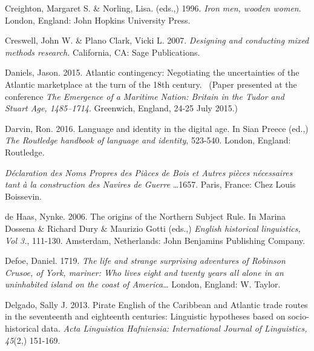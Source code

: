 \begin{styleStandard}
Creighton, Margaret S. \& Norling, Lisa. (eds.,) 1996. \textit{Iron men, wooden women}. London, England: John Hopkins University Press. 
\end{styleStandard}


\begin{styleStandard}
Creswell, John W. \& Plano Clark, Vicki L. 2007. \textit{Designing and conducting mixed methods research.} California, CA: Sage Publications.
\end{styleStandard}


\begin{styleStandard}
Daniels, Jason. 2015. Atlantic contingency: Negotiating the uncertainties of the Atlantic marketplace at the turn of the 18th century. \ (Paper presented at the conference \textit{The Emergence of a Maritime Nation: Britain in the Tudor and Stuart Age, 1485–1714}. Greenwich, England, 24-25 July 2015.)
\end{styleStandard}


\begin{styleStandard}
Darvin, Ron. 2016. Language and identity in the digital age. In Sian Preece (ed.,) \textit{The Routledge handbook of language and identity}, 523-540. London, England: Routledge. 
\end{styleStandard}


\begin{styleStandard}
\textit{Déclaration des Noms Propres des Piàces de Bois et Autres pièces nécessaires tant à la construction des Navires de Guerre }…1657. Paris, France: Chez Louis Boissevin.
\end{styleStandard}


\begin{styleStandard}
de Haas, Nynke. 2006. The origins of the Northern Subject Rule. In Marina Dossena \& Richard Dury \& Maurizio Gotti (eds.,) \textit{English historical linguistics, Vol 3.}, 111-130. Amsterdam, Netherlands: John Benjamins Publishing Company.
\end{styleStandard}


\begin{styleStandard}
Defoe, Daniel. 1719. \textit{The life and strange surprising adventures of Robinson Crusoe, of} \textit{York, mariner: Who lives eight and twenty years all alone in an uninhabited island on the coast of America… }London, England: W. Taylor. 
\end{styleStandard}


\begin{styleStandard}
Delgado, Sally J. 2013. Pirate English of the Caribbean and Atlantic trade routes in the seventeenth and eighteenth centuries: Linguistic hypotheses based on socio-historical data. \textit{Acta Linguistica Hafniensia: International Journal of Linguistics, 45}(2,) 151-169.
\end{styleStandard}


